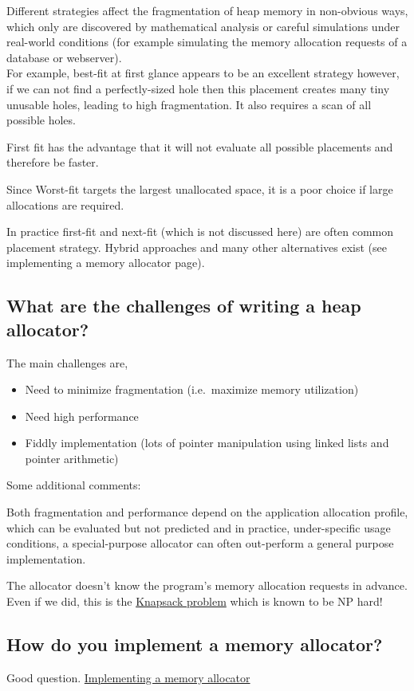 Different strategies affect the fragmentation of heap memory in
non-obvious ways, which only are discovered by mathematical analysis or
careful simulations under real-world conditions (for example simulating
the memory allocation requests of a database or webserver).\\For
example, best-fit at first glance appears to be an excellent strategy
however, if we can not find a perfectly-sized hole then this placement
creates many tiny unusable holes, leading to high fragmentation. It also
requires a scan of all possible holes.

First fit has the advantage that it will not evaluate all possible
placements and therefore be faster.

Since Worst-fit targets the largest unallocated space, it is a poor
choice if large allocations are required.

In practice first-fit and next-fit (which is not discussed here) are
often common placement strategy. Hybrid approaches and many other
alternatives exist (see implementing a memory allocator page).

\subsection{What are the challenges of writing a heap
allocator?}\label{what-are-the-challenges-of-writing-a-heap-allocator}

The main challenges are,

\begin{itemize}
\itemsep1pt\parskip0pt
\item
  Need to minimize fragmentation (i.e.~maximize memory utilization)
\item
  Need high performance
\item
  Fiddly implementation (lots of pointer manipulation using linked lists
  and pointer arithmetic)
\end{itemize}

Some additional comments:

Both fragmentation and performance depend on the application allocation
profile, which can be evaluated but not predicted and in practice,
under-specific usage conditions, a special-purpose allocator can often
out-perform a general purpose implementation.

The allocator doesn't know the program's memory allocation requests in
advance. Even if we did, this is the
\href{http://en.wikipedia.org/wiki/Knapsack_problem}{Knapsack problem}
which is known to be NP hard!

\subsection{How do you implement a memory
allocator?}\label{how-do-you-implement-a-memory-allocator}

Good question.
\href{https://github.com/angrave/SystemProgramming/wiki/Memory\%2C-Part-2\%3A-Implementing-a-Memory-Allocator}{Implementing
a memory allocator}
